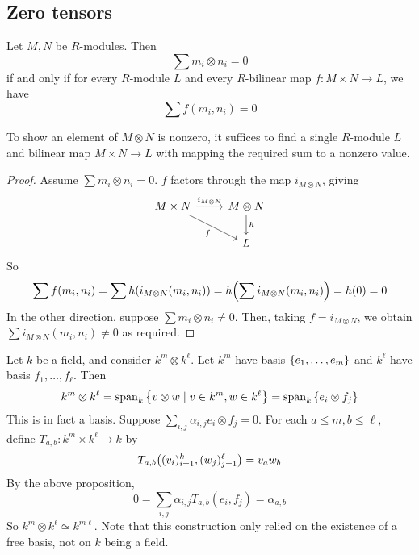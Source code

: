 \subsection{Zero tensors}
\begin{proposition}
    Let \( M, N \) be \( R \)-modules.
    Then
    \[ \sum m_i \otimes n_i = 0 \]
    if and only if for every \( R \)-module \( L \) and every \( R \)-bilinear map \( f : M \times N \to L \), we have
    \[ \sum f(m_i, n_i) = 0 \]
\end{proposition}
To show an element of \( M \otimes N \) is nonzero, it suffices to find a single \( R \)-module \( L \) and bilinear map \( M \times N \to L \) with mapping the required sum to a nonzero value.
\begin{proof}
    Assume \( \sum m_i \otimes n_i = 0 \).
    \( f \) factors through the map \( i_{M \otimes N} \), giving
    \[\begin{tikzcd}
        {M \times N} & {M \otimes N} \\
        & L
        \arrow["{i_{M \otimes N}}", from=1-1, to=1-2]
        \arrow["h", from=1-2, to=2-2]
        \arrow["f"', from=1-1, to=2-2]
    \end{tikzcd}\]
    So
    \[ \sum f(m_i, n_i) = \sum h(i_{M \otimes N}(m_i, n_i)) = h\qty(\sum i_{M \otimes N} (m_i, n_i)) = h(0) = 0 \]
    In the other direction, suppose \( \sum m_i \otimes n_i \neq 0 \).
    Then, taking \( f = i_{M \otimes N} \), we obtain \( \sum i_{M \otimes N}(m_i, n_i) \neq 0 \) as required.
\end{proof}
\begin{example}
    Let \( k \) be a field, and consider \( k^m \otimes k^\ell \).
    Let \( k^m \) have basis \( \qty{e_1, \dots, e_m} \) and \( k^\ell \) have basis \( f_1, \dots, f_\ell \).
    Then
    \[ k^m \otimes k^\ell = \operatorname{span}_k \qty{v \otimes w \mid v \in k^m, w \in k^\ell} = \operatorname{span}_k \qty{e_i \otimes f_j} \]
    This is in fact a basis.
    Suppose \( \sum_{i,j} \alpha_{i,j} e_i \otimes f_j = 0 \).
    For each \( a \leq m, b \leq \ell \), define \( T_{a,b} : k^m \times k^\ell \to k \) by
    \[ T_{a,b}\qty((v_i)_{i=1}^k, (w_j)_{j=1}^\ell) = v_a w_b \]
    By the above proposition,
    \[ 0 = \sum_{i,j} \alpha_{i,j} T_{a,b}(e_i, f_j) = \alpha_{a,b} \]
    So \( k^m \otimes k^\ell \simeq k^{m\ell} \).
    Note that this construction only relied on the existence of a free basis, not on \( k \) being a field.
\end{example}
